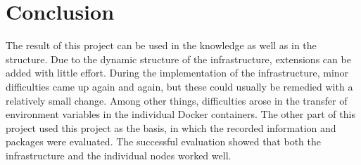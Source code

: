 \documentclass[conference]{IEEEtran}
\begin{document}
\section{Conclusion}
The result of this project can be used in the knowledge as well as in the structure. Due to the dynamic structure of the infrastructure, extensions can be added with little effort. During the implementation of the infrastructure, minor difficulties came up again and again, but these could usually be remedied with a relatively small change. Among other things, difficulties arose in the transfer of environment variables in the individual Docker containers. The other part of this project used this project as the basis, in which the recorded information and packages were evaluated. The successful evaluation showed that both the infrastructure and the individual nodes worked well.
\end{document}
